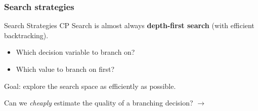 \documentclass{cons-beamer}
\begin{document}
\subsubsection{Search strategies}

\begin{frame}{Search Strategies}\label{searchCP}
	CP Search is almost always \textbf{depth-first search} (with efficient backtracking).
	\vfill
	
	\begin{itemize}
		\item Which decision variable to branch on?
		\item Which value to branch on first?
	\end{itemize}
	\vfill
	\pause
	
	Goal: explore the search space as efficiently as possible.
	\vfill
	
	Can we \textit{cheaply} estimate the quality of a branching decision? $\rightarrow$  
\end{frame}
\end{document}
